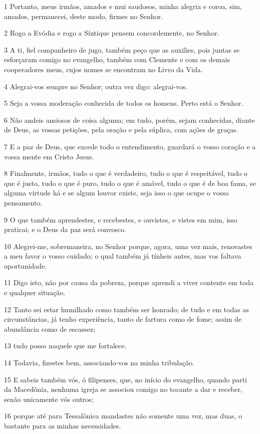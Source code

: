 \par 1 Portanto, meus irmãos, amados e mui saudosos, minha alegria e coroa, sim, amados, permanecei, deste modo, firmes no Senhor.
\par 2 Rogo a Evódia e rogo a Síntique pensem concordemente, no Senhor.
\par 3 A ti, fiel companheiro de jugo, também peço que as auxilies, pois juntas se esforçaram comigo no evangelho, também com Clemente e com os demais cooperadores meus, cujos nomes se encontram no Livro da Vida.
\par 4 Alegrai-vos sempre no Senhor; outra vez digo: alegrai-vos.
\par 5 Seja a vossa moderação conhecida de todos os homens. Perto está o Senhor.
\par 6 Não andeis ansiosos de coisa alguma; em tudo, porém, sejam conhecidas, diante de Deus, as vossas petições, pela oração e pela súplica, com ações de graças.
\par 7 E a paz de Deus, que excede todo o entendimento, guardará o vosso coração e a vossa mente em Cristo Jesus.
\par 8 Finalmente, irmãos, tudo o que é verdadeiro, tudo o que é respeitável, tudo o que é justo, tudo o que é puro, tudo o que é amável, tudo o que é de boa fama, se alguma virtude há e se algum louvor existe, seja isso o que ocupe o vosso pensamento.
\par 9 O que também aprendestes, e recebestes, e ouvistes, e vistes em mim, isso praticai; e o Deus da paz será convosco.
\par 10 Alegrei-me, sobremaneira, no Senhor porque, agora, uma vez mais, renovastes a meu favor o vosso cuidado; o qual também já tínheis antes, mas vos faltava oportunidade.
\par 11 Digo isto, não por causa da pobreza, porque aprendi a viver contente em toda e qualquer situação.
\par 12 Tanto sei estar humilhado como também ser honrado; de tudo e em todas as circunstâncias, já tenho experiência, tanto de fartura como de fome; assim de abundância como de escassez;
\par 13 tudo posso naquele que me fortalece.
\par 14 Todavia, fizestes bem, associando-vos na minha tribulação.
\par 15 E sabeis também vós, ó filipenses, que, no início do evangelho, quando parti da Macedônia, nenhuma igreja se associou comigo no tocante a dar e receber, senão unicamente vós outros;
\par 16 porque até para Tessalônica mandastes não somente uma vez, mas duas, o bastante para as minhas necessidades.
